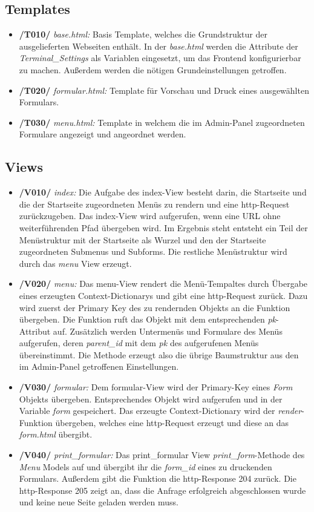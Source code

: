 \vspace{1,5cm}

\subsection{Templates}
\begin{itemize}
    \item \textbf{/T010/} \textit{base.html:} Basis Template, welches die Grundstruktur der ausgelieferten Webseiten enthält. In der \textit{base.html} werden die Attribute der \textit{Terminal\_Settings} als Variablen eingesetzt, um das Frontend konfigurierbar zu machen. Außerdem werden die nötigen Grundeinstellungen getroffen.
    \item \textbf{/T020/} \textit{formular.html:} Template für Vorschau und Druck eines ausgewählten Formulars.
    \item \textbf{/T030/} \textit{menu.html:} Template in welchem die im Admin-Panel zugeordneten Formulare angezeigt und angeordnet werden.
\end{itemize}
\newpage
\subsection{Views}
\begin{itemize}
    \item \textbf{/V010/} \textit{index:} Die Aufgabe des index-View besteht darin, die Startseite und die der Startseite zugeordneten Menüs zu rendern und eine http-Request zurückzugeben.  Das index-View wird aufgerufen, wenn eine URL ohne weiterführenden Pfad übergeben wird. Im Ergebnis steht entsteht ein Teil der Menüstruktur mit der Startseite als Wurzel und den der Startseite zugeordneten Submenus und Subforms. Die restliche Menüstruktur wird durch das \textit{menu} View erzeugt.
    \item \textbf{/V020/} \textit{menu:}  Das menu-View rendert die Menü-Tempaltes durch Übergabe eines erzeugten Context-Dictionarys und gibt eine http-Request zurück. Dazu wird zuerst der Primary Key des zu rendernden Objekts an die Funktion übergeben. Die Funktion ruft das Objekt mit dem entsprechenden \textit{pk}-Attribut auf. Zusätzlich werden Untermenüs und Formulare des Menüs aufgerufen, deren \textit{parent\_id} mit dem \textit{pk} des aufgerufenen Menüs übereinstimmt. Die Methode erzeugt also die übrige Baumstruktur aus den im Admin-Panel getroffenen Einstellungen.
    \item \textbf{/V030/} \textit{formular:} Dem formular-View wird der Primary-Key eines \textit{Form} Objekts übergeben. Entsprechendes Objekt wird aufgerufen und in der Variable \textit{form} gespeichert. Das erzeugte Context-Dictionary wird der \textit{render}-Funktion übergeben, welches eine http-Request erzeugt und diese an das \textit{form.html} übergibt.
    \item \textbf{/V040/} \textit{print\_formular:} Das print\_formular View \textit{print\_form}-Methode des \textit{Menu} Models auf und übergibt ihr die \textit{form\_id} eines zu druckenden Formulars. Außerdem gibt die Funktion die http-Response 204 zurück. Die http-Response 205 zeigt an, dass die Anfrage erfolgreich abgeschlossen wurde und keine neue Seite geladen werden muss. 
\end{itemize}
\newpage 